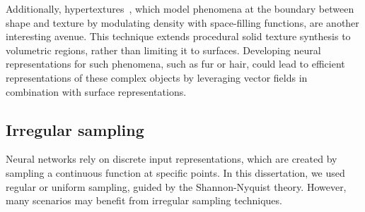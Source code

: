 
Additionally, hypertextures~\citep{hypertexture}, which model phenomena at the boundary between shape and texture by modulating density with space-filling functions, are another interesting avenue. This technique extends procedural solid texture synthesis to volumetric regions, rather than limiting it to surfaces. Developing neural representations for such phenomena, such as fur or hair, could lead to efficient representations of these complex objects by leveraging vector fields in combination with surface representations.


\subsection{Irregular sampling}


Neural networks rely on discrete input representations, which are created by sampling a continuous function at specific points. In this dissertation, we used regular or uniform sampling, guided by the Shannon-Nyquist theory. However, many scenarios may benefit from irregular sampling techniques.


